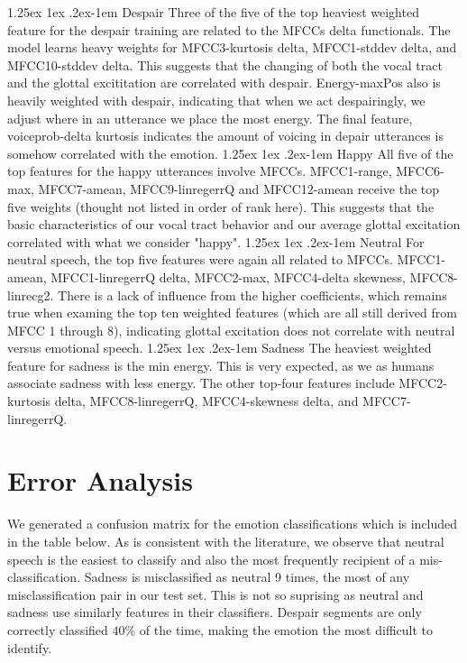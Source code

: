 \documentclass[twocolumn, 11pt]{article}
\makeatletter
\renewcommand{\paragraph}{%
  \@startsection{paragraph}{4}%
  {\z@}{1.25ex \@plus 1ex \@minus .2ex}{-1em}%
  {\normalfont\normalsize\bfseries}%
}
\makeatother
\begin{document}
\paragraph{Despair} Three of the five of the top heaviest weighted feature for the despair training are related to the MFCCs delta functionals. The model learns heavy weights for MFCC3-kurtosis delta,  MFCC1-stddev delta, and MFCC10-stddev delta. This suggests that the changing of both the vocal tract and the glottal excititation are correlated with despair. Energy-maxPos also is heavily weighted with despair, indicating that when we act despairingly, we adjust where in an utterance we place the most energy. The final feature, voiceprob-delta kurtosis indicates the amount of voicing in depair utterances is somehow correlated with the emotion.
\paragraph{Happy} All five of the top features for the happy utterances involve MFCCs. MFCC1-range, MFCC6-max, MFCC7-amean, MFCC9-linregerrQ and MFCC12-amean receive the top five weights (thought not listed in order of rank here). This suggests that the basic characteristics of our vocal tract behavior and our average glottal excitation correlated with what we consider "happy". 
\paragraph{Neutral} For neutral speech, the top five features were again all related to MFCCs. MFCC1-amean, MFCC1-linregerrQ delta, MFCC2-max, MFCC4-delta skewness, MFCC8-linrecg2. There is a lack of influence from the higher coefficients, which remains true when examing the top ten weighted features (which are all still derived from MFCC 1 through 8), indicating glottal excitation does not correlate with neutral versus emotional speech.
\paragraph{Sadness} The heaviest weighted feature for sadness is the min energy. This is very expected, as we as humans associate sadness with less energy. The other top-four features include MFCC2-kurtosis delta, MFCC8-linregerrQ, MFCC4-skewness delta, and MFCC7-linregerrQ. 

\section{Error Analysis}
We generated a confusion matrix for the emotion classifications which is included in the table below. As is consistent with the literature, we observe that neutral speech is the easiest to classify and also the most frequently recipient of a mis-classification. Sadness is misclassified as neutral 9 times, the most of any misclassification pair in our test set. This is not so suprising as neutral and sadness use similarly features in their classifiers. Despair segments are only correctly classified $40\%$ of the time, making the emotion the most difficult to identify. 
\end{document}
